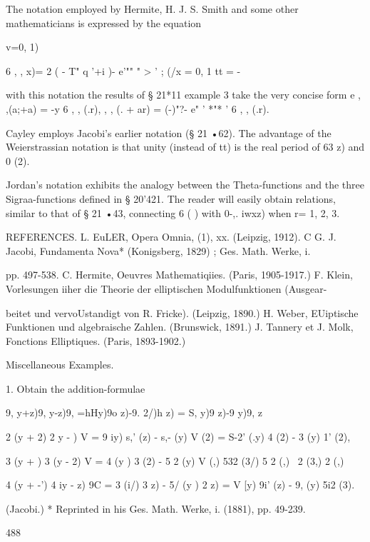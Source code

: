 The notation employed by Hermite, H. J. S. Smith and some other mathematicians is 
expressed by the equation 



v=0, 1) 



6 , , x)= 2 ( - T" q  '+i )- e'""  " >  '  ; (/x = 0, 1 
tt = -   

with this notation the results of § 21*11 example 3 take the very concise form 
e , ,(a;+a) =  -y 6 , , (.r),  , , (.   + ar) = (-)"?-   e" ' *"* '  6 , , (.r). 

Cayley employs Jacobi's earlier notation (§ 21 •62). The advantage of the Weierstrassian 
notation is that unity (instead of tt) is the real period of 63  z) and  0 (2). 

Jordan's notation exhibits the analogy between the Theta-functions and the three 
Sigraa-functions defined in § 20'421. The reader will easily obtain relations, similar 
to that of § 21 •43, connecting 6  ( ) with 0-,.  iwxz) when r= 1, 2, 3. 

REFERENCES. 
L. EuLER, Opera Omnia, (1), xx. (Leipzig, 1912). 
C G. J. Jacobi, Fundamenta Nova* (Konigsberg, 1829) ; Ges. Math. Werke, i. 

pp. 497-538. 
C. Hermite, Oeuvres Mathematiqiies. (Paris, 1905-1917.) 
F. Klein, Vorlesungen iiher die Theorie der elliptischen Modulfunktionen (Ausgear- 

beitet und vervoUstandigt von R. Fricke). (Leipzig, 1890.) 
H. Weber, EUiptische Funktionen und algebraische Zahlen. (Brunswick, 1891.) 
J. Tannery et J. Molk, Fonctions Elliptiques. (Paris, 1893-1902.) 

Miscellaneous Examples. 

1. Obtain the addition-formulae 

9, y+z)9, y-z)9, =hHy)9o  z)-9.  2/)h  z) = S, y)9  z)-9  y)9,  z\ 

 2 (y + 2)   2  y -  ) V = 9  iy) s,' (z) - s,-  (y) V (2) = S-2' (.y)  4  (2) -  3  (y)  1' (2), 

 3 (y +  )  3 (y - 2) V =  4  (y )  3  (2) - 5 2 (y) V (,)   532 (3/) 5 2 (,) \   2 (3,)  2 (,)  

 4 (y + -')  4 iy - z) 9C  =  3  (i/)  3   z) - 5/ (y )  2   z) = V [y) 9i' (z) - 9,  (y) 5i2 (3). 

(Jacobi.) 
* Reprinted in his Ges. Math. Werke, i. (1881), pp. 49-239. 



488 



